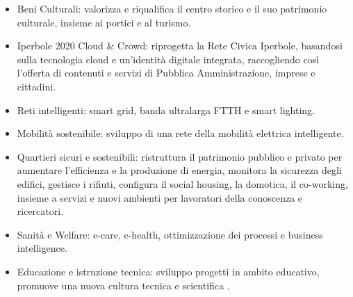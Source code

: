 \begin{itemize}
    \item Beni Culturali: valorizza e riqualifica il centro storico e il suo patrimonio culturale, insieme ai portici e al turismo.
    \item Iperbole 2020 Cloud \& Crowd: riprogetta la Rete Civica Iperbole, basandosi sulla tecnologia cloud e un'identità digitale integrata, raccogliendo così l'offerta di contenuti e servizi di Pubblica Amministrazione, imprese e cittadini.
    \item Reti intelligenti: smart grid, banda ultralarga FTTH e smart lighting.
    \item Mobilità sostenibile: sviluppo di una rete della mobilità elettrica intelligente.
    \item Quartieri sicuri e sostenibili: ristruttura il patrimonio pubblico e privato per aumentare l'efficienza e la produzione di energia, monitora la sicurezza degli edifici, gestisce i rifiuti, configura il social housing, la domotica, il co-working, insieme a servizi e nuovi ambienti per lavoratori della conoscenza e ricercatori.
    \item Sanità e Welfare: e-care, e-health, ottimizzazione dei processi e business intelligence.
    \item Educazione e istruzione tecnica: sviluppo progetti in ambito educativo, promuove una nuova cultura tecnica e scientifica \cite{Bologna_Smart_City}.
\end{itemize}


